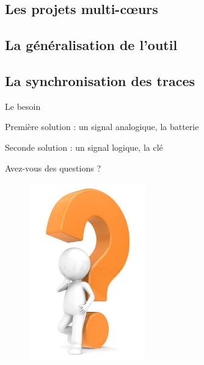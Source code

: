 \documentclass{beamer}
\begin{document}
	\subsection{Les projets multi-cœurs}
	\subsection{La généralisation de l'outil}
	\subsection{La synchronisation des traces}
	\begin{frame}{Le besoin}
	\end{frame}
	\begin{frame}{\normalsize Première solution : un signal analogique, la batterie}
	\end{frame}
	\begin{frame}{\normalsize Seconde solution : un signal logique, la clé}
	\end{frame}
		
%

	

	\begin{frame}{Avez-vous des questions ?}
		\begin{figure}[H]
			\centering
			\includegraphics[width=5cm]{images/interrogation.jpg}
		\end{figure}
	\end{frame}
\end{document}
